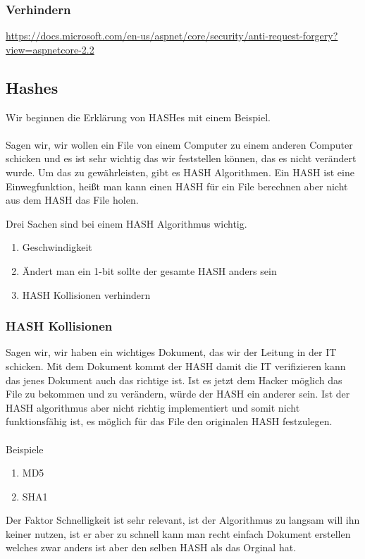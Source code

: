 {\subsubsection{Verhindern}
\label{sec:xsrf_prevent}
\url{https://docs.microsoft.com/en-us/aspnet/core/security/anti-request-forgery?view=aspnetcore-2.2}
\subsection{Hashes}
\label{hash-expl}
Wir beginnen die Erklärung von HASHes mit einem Beispiel.
\\ \\
Sagen wir, wir wollen ein File von einem Computer zu einem anderen Computer schicken und es ist sehr wichtig das wir feststellen können, das es nicht verändert wurde. Um das zu gewährleisten, gibt es HASH Algorithmen. Ein HASH ist eine Einwegfunktion, heißt man kann einen HASH für ein File berechnen aber nicht aus dem HASH das File holen. 

Drei Sachen sind bei einem HASH Algorithmus wichtig.
\begin{enumerate}
\item Geschwindigkeit
\item Ändert man ein 1-bit sollte der gesamte HASH anders sein
\item HASH Kollisionen verhindern 
\end{enumerate}

\subsubsection{HASH Kollisionen}
\label{sec:hash_coll}
Sagen wir, wir haben ein wichtiges Dokument, das wir der Leitung in der IT schicken. Mit dem Dokument kommt der HASH damit die IT verifizieren kann das jenes Dokument auch das richtige ist. Ist es jetzt dem Hacker möglich das File zu bekommen und zu verändern, würde der HASH ein anderer sein. Ist der HASH algorithmus aber nicht richtig implementiert und somit nicht funktionsfähig ist, es möglich für das File den originalen HASH festzulegen.
\\ \\
Beispiele
\begin{enumerate}
\item MD5
\item SHA1
\end{enumerate}
Der Faktor Schnelligkeit ist sehr relevant, ist der Algorithmus zu langsam will ihn keiner nutzen, ist er aber zu schnell kann man recht einfach Dokument erstellen welches zwar anders ist aber den selben HASH als das Orginal hat.
}
